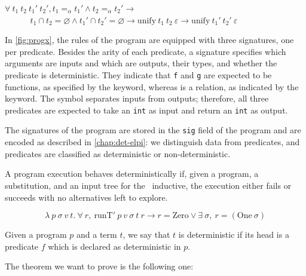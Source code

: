 % 
\begin{lemma}\label{th:unifren}
  $\forall\ t_1\ t_2\ t_1'\ t_2', t_1 =_\alpha t_1' \land t_2 =_\alpha t_2' \to$
  \vspace{.8em}\\
  $\phantom{xxxxA}
  t_1 \cap t_2 = \varnothing \land t_1' \cap t_2' = \varnothing \to
  \mathrm{unify}\ t_1\ t_2\ \varepsilon \to \mathrm{unify}\ t_1'\ t_2'\ \varepsilon
  $
\end{lemma}

In \cref{fig:progx}, the rules of the program are equipped with three
signatures, one per predicate. Besides the arity of each predicate, a
signature specifies which arguments are inputs and which are outputs,
their types, and whether the predicate is deterministic. They indicate
that \texttt{f} and \texttt{g} are expected to be functions, as specified
by the  keyword, whereas  is a relation, as
indicated by the  keyword. The
 symbol separates inputs from
outputs; therefore, all three predicates are expected to take an
\texttt{int} as input and return an \texttt{int} as output.

The signatures of the program are stored in the \texttt{sig} field of
the program and are encoded as described in
\cref{chap:det-elpi}: we distinguish data from predicates, and predicates
are classified as deterministic or non-deterministic.

A program execution behaves deterministically if, given a program, a
substitution, and an input tree for the \runT\ inductive, the execution
either fails or succeeds with no alternatives left to explore.


% 
\begin{definition}[is\_det]\label{th:isdet}%
	$$\lambda\ p\ \sigma\ v\ t .\ \forall\ r ,\ \mathrm{runT'}\ p\ v\ \sigma\ t\ r \to r = \mathrm{Zero} \lor \exists\ \sigma ,\ r = ( \mathrm{One}\ \sigma ) $$
\end{definition}

\begin{definition}[tm\_is\_det]\label{def:tmisdet}
  Given a program $p$ and a term $t$,
  we say that $t$ is deterministic if its head is a predicate $f$
  which is declared as deterministic in $p$.
\end{definition}

The theorem we want to prove is the following one:

